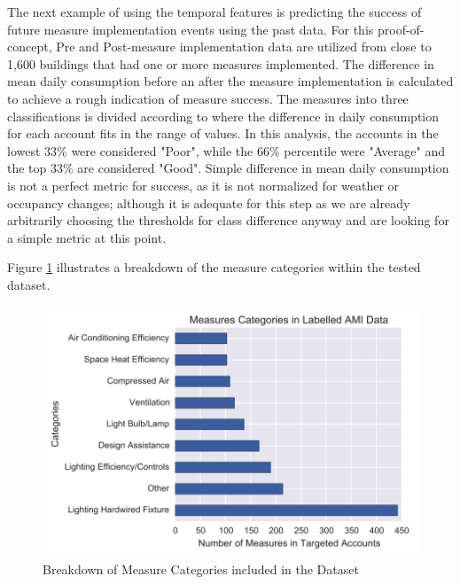 The next example of using the temporal features is predicting the success of future measure implementation events using the past data. For this proof-of-concept, Pre and Post-measure implementation data are utilized from close to 1,600 buildings that had one or more measures implemented. The difference in mean daily consumption before an after the measure implementation is calculated to achieve a rough indication of measure success. The measures into three classifications is divided according to where the difference in daily consumption for each account fits in the range of values. In this analysis, the accounts in the lowest 33\% were considered "Poor", while the 66\% percentile were "Average" and the top 33\% are considered "Good". Simple difference in mean daily consumption is not a perfect metric for success, as it is not normalized for weather or occupancy changes; although it is adequate for this step as we are already arbitrarily choosing the thresholds for class difference anyway and are looking for a simple metric at this point. 


Figure \ref{fig:measurecatbreakdown} illustrates a breakdown of the measure categories within the tested dataset. 

\begin{figure}[ht!]
\begin{center}
\includegraphics[width=0.7\columnwidth]{figures/measures_ami/measures_ami}
\caption{{Breakdown of Measure Categories included in the Dataset
\label{fig:measurecatbreakdown}%
}}
\end{center}
\end{figure}

